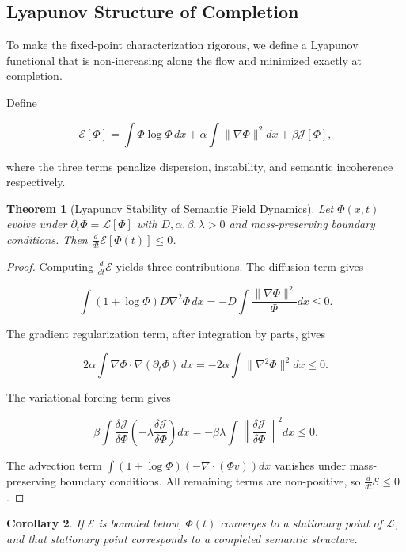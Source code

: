 \documentclass[11pt, twoside]{article}
\theoremstyle{plain}
\newtheorem{theorem}{Theorem}[section]
\newtheorem{corollary}[theorem]{Corollary}
\theoremstyle{definition}
\theoremstyle{remark}
\begin{document}
\subsection{Lyapunov Structure of Completion}

To make the fixed-point characterization rigorous, we define a Lyapunov functional that is non-increasing along the flow and minimized exactly at completion.

Define

\[
\mathcal{E}[\Phi] = \int \Phi \log \Phi \, dx + \alpha \int \|\nabla \Phi\|^2 dx + \beta \mathcal{J}[\Phi],
\]

where the three terms penalize dispersion, instability, and semantic incoherence respectively.

\begin{theorem}[Lyapunov Stability of Semantic Field Dynamics]
\label{thm:lyapunov}
Let $\Phi(x,t)$ evolve under $\partial_t \Phi = \mathcal{L}[\Phi]$ with $D, \alpha, \beta, \lambda > 0$ and mass-preserving boundary conditions. Then $\frac{d}{dt}\mathcal{E}[\Phi(t)] \leq 0$.
\end{theorem}

\begin{proof}
Computing $\frac{d}{dt}\mathcal{E}$ yields three contributions. The diffusion term gives

\[
\int (1 + \log \Phi) D\nabla^2\Phi \, dx = -D\int \frac{\|\nabla\Phi\|^2}{\Phi} dx \leq 0.
\]

The gradient regularization term, after integration by parts, gives

\[
2\alpha \int \nabla\Phi \cdot \nabla(\partial_t\Phi) \, dx = -2\alpha \int \|\nabla^2\Phi\|^2 dx \leq 0.
\]

The variational forcing term gives

\[
\beta \int \frac{\delta\mathcal{J}}{\delta\Phi} \left(-\lambda \frac{\delta\mathcal{J}}{\delta\Phi}\right) dx = -\beta\lambda \int \left\|\frac{\delta\mathcal{J}}{\delta\Phi}\right\|^2 dx \leq 0.
\]

The advection term $\int (1 + \log\Phi)(-\nabla \cdot (\Phi v)) dx$ vanishes under mass-preserving boundary conditions. All remaining terms are non-positive, so $\frac{d}{dt}\mathcal{E} \leq 0$.
\end{proof}

\begin{corollary}
If $\mathcal{E}$ is bounded below, $\Phi(t)$ converges to a stationary point of $\mathcal{L}$, and that stationary point corresponds to a completed semantic structure.
\end{corollary}
\end{document}
